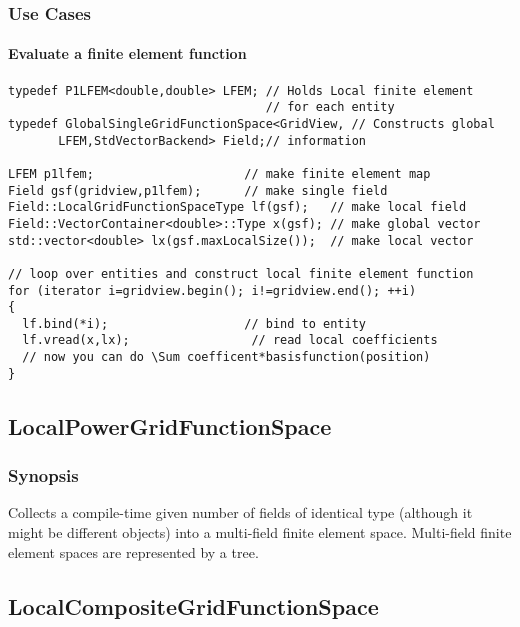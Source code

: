 \documentclass[11pt,a4paper,DIV11,%
notitlepage,oneside,abstracton,%
bibtotoc]{scrartcl}
\begin{document}
\subsubsection{Use Cases}

\paragraph{Evaluate a finite element function} \mbox{}

\begin{lstlisting}
typedef P1LFEM<double,double> LFEM; // Holds Local finite element
                                    // for each entity
typedef GlobalSingleGridFunctionSpace<GridView, // Constructs global 
       LFEM,StdVectorBackend> Field;// information

LFEM p1lfem;                     // make finite element map
Field gsf(gridview,p1lfem);      // make single field
Field::LocalGridFunctionSpaceType lf(gsf);   // make local field 
Field::VectorContainer<double>::Type x(gsf); // make global vector
std::vector<double> lx(gsf.maxLocalSize());  // make local vector

// loop over entities and construct local finite element function
for (iterator i=gridview.begin(); i!=gridview.end(); ++i)
{
  lf.bind(*i);                   // bind to entity
  lf.vread(x,lx);                 // read local coefficients
  // now you can do \Sum coefficent*basisfunction(position)
} 
\end{lstlisting}


\subsection{LocalPowerGridFunctionSpace}

\subsubsection{Synopsis}

Collects a compile-time given number of fields of identical type (although it might
be different objects) into a multi-field finite element space. 
Multi-field finite element spaces are represented by a tree.

\subsection{LocalCompositeGridFunctionSpace}
\end{document}
